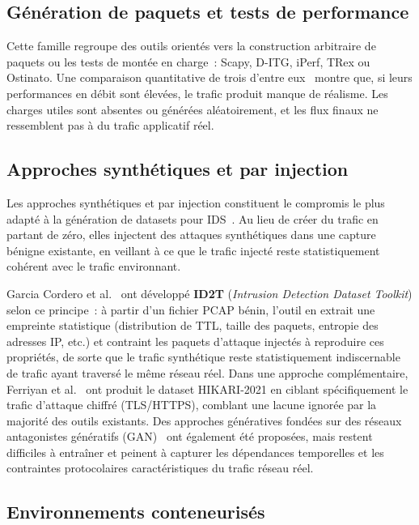\documentclass[12pt, a4paper]{report}
\begin{document}
\subsection{Génération de paquets et tests de performance}
 
Cette famille regroupe des outils orientés vers la construction arbitraire de paquets ou les
tests de montée en charge~: Scapy, D-ITG, iPerf, TRex ou Ostinato. Une comparaison quantitative
de trois d'entre eux~\cite{koay2021} montre que, si leurs performances en débit sont élevées,
le trafic produit manque de réalisme. Les charges utiles sont absentes ou générées
aléatoirement, et les flux finaux ne ressemblent pas à du trafic applicatif réel.
 
\subsection{Approches synthétiques et par injection}
 
Les approches synthétiques et par injection constituent le compromis le plus adapté à la
génération de datasets pour IDS~\cite{adeleke2022}. Au lieu de créer du trafic en partant de zéro,
elles injectent des attaques synthétiques dans une capture bénigne existante, en veillant à
ce que le trafic injecté reste statistiquement cohérent avec le trafic environnant.
 
Garcia Cordero et al.~\cite{id2t2021} ont développé \textbf{ID2T} (\textit{Intrusion
Detection Dataset Toolkit}) selon ce principe~: à partir d'un fichier PCAP bénin, l'outil
en extrait une empreinte statistique (distribution de TTL, taille des paquets, entropie des
adresses IP, etc.) et contraint les paquets d'attaque injectés à reproduire ces propriétés,
de sorte que le trafic synthétique reste statistiquement indiscernable de trafic ayant
traversé le même réseau réel.
Dans une approche complémentaire, Ferriyan et al.~\cite{hikari2021} ont produit le dataset
HIKARI-2021 en ciblant spécifiquement le trafic d'attaque chiffré (TLS/HTTPS), comblant une
lacune ignorée par la majorité des outils existants.
Des approches génératives fondées sur des réseaux antagonistes génératifs
(GAN)~\cite{ring2019gan} ont également été proposées, mais restent difficiles à entraîner
et peinent à capturer les dépendances temporelles et les contraintes protocolaires
caractéristiques du trafic réseau réel.
 
\subsection{Environnements conteneurisés}
 
\end{document}
